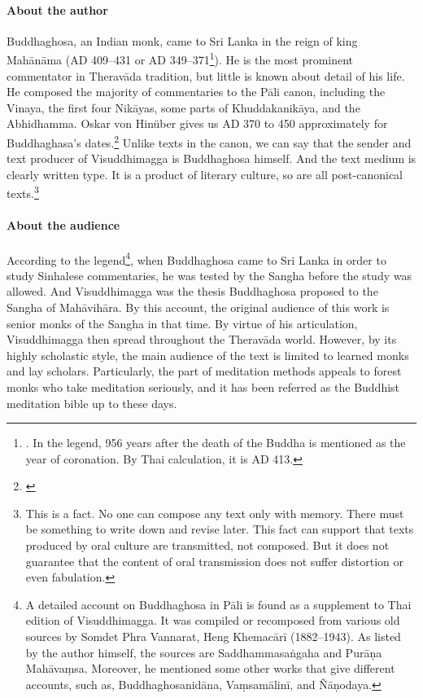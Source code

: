 \paragraph*{About the author} Buddhaghosa, an Indian monk, came to Sri Lanka in the reign of king Mah\=an\=ama (AD 409--431 or AD 349--371\footnote{\citealp[p.~102]{hinuber:literature}. In the legend, 956 years after the death of the Buddha is mentioned as the year of coronation. By Thai calculation, it is AD 413.}). He is the most prominent commentator in Therav\=ada tradition, but little is known about detail of his life. He composed the majority of commentaries to the P\=ali canon, including the Vinaya, the first four Nik\=ayas, some parts of Khuddakanik\=aya, and the Abhidhamma. Oskar von Hin\"uber gives us AD 370 to 450 approximately for Buddhaghasa's dates.\footnote{\citealp[p.~103]{hinuber:literature}} Unlike texts in the canon, we can say that the sender and text producer of Visuddhimagga is Buddhaghosa himself. And the text medium is clearly written type. It is a product of literary culture, so are all post-canonical texts.\footnote{This is a fact. No one can compose any text only with memory. There must be something to write down and revise later. This fact can support that texts produced by oral culture are transmitted, not composed. But it does not guarantee that the content of oral transmission does not suffer distortion or even fabulation.}

\paragraph*{About the audience} According to the legend\footnote{A detailed account on Buddhaghosa in P\=ali is found as a supplement to Thai edition of Visuddhimagga. It was compiled or recomposed from various old sources by Somdet Phra Vannarat, Heng Khemac\=ar\=i (1882--1943). As listed by the author himself, the sources are Saddhammasa\.ngaha and Pur\=a\d na Mah\=ava\d msa. Moreover, he mentioned some other works that give different accounts, such as, Buddhaghosanid\=ana, Va\d msam\=alin\=i, and \~N\=a\d nodaya.}, when Buddhagh\-osa came to Sri Lanka in order to study Sinhalese commentaries, he was tested by the Sangha before the study was allowed. And Visuddhimagga was the thesis Buddhaghosa proposed to the Sangha of Mah\=avih\=ara. By this account, the original audience of this work is senior monks of the Sangha in that time. By virtue of his articulation, Visuddhimagga then spread throughout the Therav\=ada world. However, by its highly scholastic style, the main audience of the text is limited to learned monks and lay scholars. Particularly, the part of meditation methods appeals to forest monks who take meditation seriously, and it has been referred as the Buddhist meditation bible up to these days.
 
